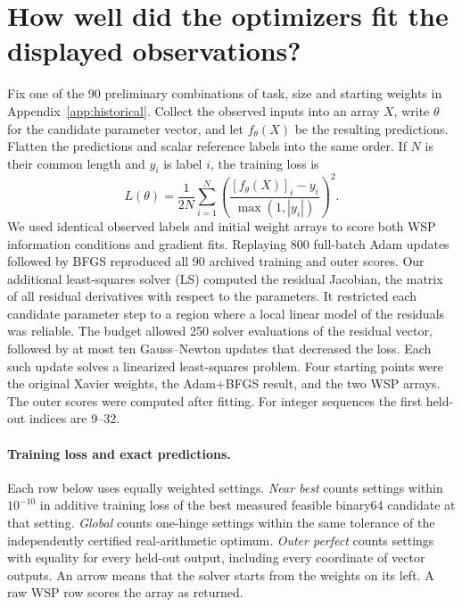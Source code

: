 \section{How well did the optimizers fit the displayed observations?}
\label{app:optimizer}
Fix one of the 90 preliminary combinations of task, size and starting weights in Appendix~\ref{app:historical}. Collect the observed inputs into an array \(X\), write \(\theta\) for the candidate parameter vector, and let \(f_\theta(X)\) be the resulting predictions. Flatten the predictions and scalar reference labels into the same order. If \(N\) is their common length and \(y_i\) is label \(i\), the training loss is
\[
 L(\theta)=\frac{1}{2N}\sum_{i=1}^{N}
 \left(\frac{[f_\theta(X)]_i-y_i}{\max(1,|y_i|)}\right)^2 .
\]
We used identical observed labels and initial weight arrays to score both WSP information conditions and gradient fits. Replaying 800 full-batch Adam updates followed by BFGS reproduced all 90 archived training and outer scores. Our additional least-squares solver (LS) computed the residual Jacobian, the matrix of all residual derivatives with respect to the parameters. It restricted each candidate parameter step to a region where a local linear model of the residuals was reliable. The budget allowed 250 solver evaluations of the residual vector, followed by at most ten Gauss--Newton updates that decreased the loss. Each such update solves a linearized least-squares problem. Four starting points were the original Xavier weights, the Adam+BFGS result, and the two WSP arrays. The outer scores were computed after fitting. For integer sequences the first held-out indices are 9--32.

\paragraph{Training loss and exact predictions.}
Each row below uses equally weighted settings. \emph{Near best} counts settings within \(10^{-10}\) in additive training loss of the best measured feasible binary64 candidate at that setting. \emph{Global} counts one-hinge settings within the same tolerance of the independently certified real-arithmetic optimum. \emph{Outer perfect} counts settings with equality for every held-out output, including every coordinate of vector outputs. An arrow means that the solver starts from the weights on its left. A raw WSP row scores the array as returned.

